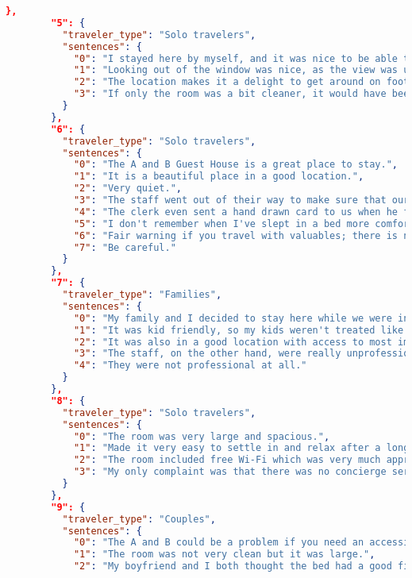 \begin{lstlisting}[language=json,basicstyle=\scriptsize,columns=flexible]
        },
        "5": {
          "traveler_type": "Solo travelers",
          "sentences": {
            "0": "I stayed here by myself, and it was nice to be able to wash my clothes at the laundry.",
            "1": "Looking out of the window was nice, as the view was unique.",
            "2": "The location makes it a delight to get around on foot, and see things.",
            "3": "If only the room was a bit cleaner, it would have been perfect."
          }
        },
        "6": {
          "traveler_type": "Solo travelers",
          "sentences": {
            "0": "The A and B Guest House is a great place to stay.",
            "1": "It is a beautiful place in a good location.",
            "2": "Very quiet.",
            "3": "The staff went out of their way to make sure that our stay was outstanding.",
            "4": "The clerk even sent a hand drawn card to us when he found it was our anniversary.",
            "5": "I don't remember when I've slept in a bed more comfortable than the one here.",
            "6": "Fair warning if you travel with valuables; there is no safety box in the room.",
            "7": "Be careful."
          }
        },
        "7": {
          "traveler_type": "Families",
          "sentences": {
            "0": "My family and I decided to stay here while we were in town.",
            "1": "It was kid friendly, so my kids weren't treated like garbage.",
            "2": "It was also in a good location with access to most important things, and parking was completely free.",
            "3": "The staff, on the other hand, were really unprofessional and laid back.",
            "4": "They were not professional at all."
          }
        },
        "8": {
          "traveler_type": "Solo travelers",
          "sentences": {
            "0": "The room was very large and spacious.",
            "1": "Made it very easy to settle in and relax after a long trip, and even more relaxing with the excellent view out of my window!",
            "2": "The room included free Wi-Fi which was very much appreciated because its quite uncommon to get free internet service these days!",
            "3": "My only complaint was that there was no concierge service and I had to take care of this myself - a bit annoying but overall a great stay."
          }
        },
        "9": {
          "traveler_type": "Couples",
          "sentences": {
            "0": "The A and B could be a problem if you need an accessible room you may need to book elsewhere.",
            "1": "The room was not very clean but it was large.",
            "2": "My boyfriend and I both thought the bed had a good firmness for our liking.",

\end{lstlisting}
